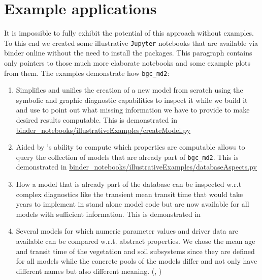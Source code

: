 \section{Example applications}  
\label{sec:ExampleApplications}
It is impossible to fully exhibit the potential of this approach without
examples.
To this end we created some illustrative \texttt{Jupyter} notebooks that are
available via binder online without the need to install the packages. 
This paragraph contains only pointers to those much more elaborate notebooks
and some example plots from them.
The examples demonstrate how \texttt{bgc_md2}:
\begin{enumerate}
\item 
  Simplifies and unifies the creation of a new model from scratch using the
  symbolic and graphic diagnostic capabilities to inspect it while we build it
  and use 
  \ComputabilityGraphs{} to point out what missing information we have to
  provide to make desired results computable.
  This is demonstrated in
    \href{https://github.com/MPIBGC-TEE/bgc_md2/blob/binder/binder_notebooks/illustrativeExamples/createModel.py}{binder\_notebooks/illustrativeExamples/createModel.py}
    
\item 
  Aided by \ComputabilityGraphs{}'s ability to compute which properties are computable
  allows to query the collection of models that are already part of
  \texttt{bgc\_md2}.
  This is demonstrated in
    \href{https://github.com/MPIBGC-TEE/bgc_md2/blob/binder/binder_notebooks/illustrativeExamples/databaseAspects.py}{binder\_notebooks/illustrativeExamples/databaseAspects.py}
\item 
 How a model that is already part of the database can be
 inspected w.r.t complex diagnostics like the transient mean transit time that
 would take years to implement in stand alone model code but are now available
 for all models with sufficient information.
 This is demonstrated in
\item 
  \label{enum:trendy}
  Several models for which numeric parameter values and driver data are
  available can be compared w.r.t. abstract properties.
  We chose the mean age and transit time of the vegetation and soil subsystems
  since they are defined for all models while the concrete pools of the models
  differ and not only have different names but also different meaning.
  (, ) 
\end{enumerate}
